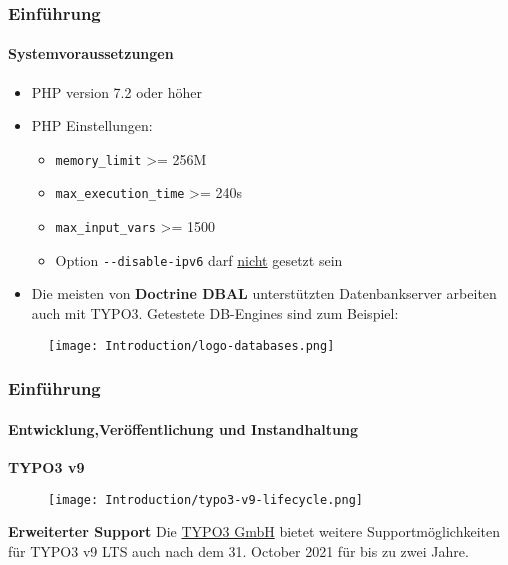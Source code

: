 \begin{frame}[fragile]
	\frametitle{Einführung}
	\framesubtitle{Systemvoraussetzungen}

	\begin{itemize}
		\item PHP version 7.2 oder höher
		\item PHP Einstellungen:

			\begin{itemize}
				\item \texttt{memory\_limit} >= 256M
				\item \texttt{max\_execution\_time} >= 240s
				\item \texttt{max\_input\_vars} >= 1500
				\item Option \texttt{-}\texttt{-disable-ipv6} darf \underline{nicht} gesetzt sein
			\end{itemize}

		\item Die meisten von \textbf{Doctrine DBAL} unterstützten Datenbankserver arbeiten auch mit TYPO3.
			Getestete DB-Engines sind zum Beispiel:
	\end{itemize}

	\begin{figure}
		\texttt{[image: Introduction/logo-databases.png]}
	\end{figure}

\end{frame}


\begin{frame}[fragile]
	\frametitle{Einführung}
	\framesubtitle{Entwicklung,Veröffentlichung und Instandhaltung}

	\textbf{TYPO3 v9}

	\begin{figure}
		\texttt{[image: Introduction/typo3-v9-lifecycle.png]}
	\end{figure}

	\textbf{Erweiterter Support}\newline
	\smaller
		Die \href{https://typo3.com}{TYPO3 GmbH} bietet weitere Supportmöglichkeiten für 
		TYPO3 v9 LTS auch nach dem 31. October 2021 für bis zu zwei
		Jahre.
	\normalsize


\end{frame}

